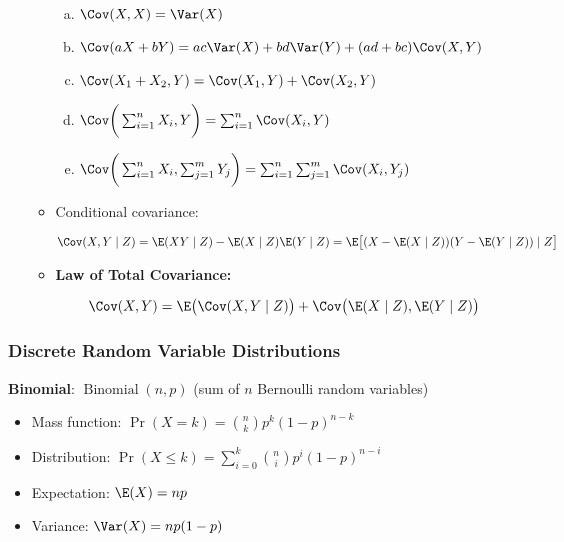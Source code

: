 \begin{itemize}
\begin{itemize}
\begin{theorem}
\begin{enumerate}[(a)]
\item \(\Cov(X, X) = \Var(X)\)

\item \(\Cov(aX + bY) = ac\Var(X) + bd\Var(Y) + (ad + bc)\Cov(X, Y)\)

\item \(\Cov(X_1 + X_2, Y) = \Cov(X_1, Y) + \Cov(X_2, Y)\)

\item \(\Cov\bigg( \sum_{i=1}^n X_i , Y\bigg) = \sum_{i=1}^n \Cov(X_i, Y)\)

\item \(\Cov\bigg( \sum_{i=1}^n X_i, \sum_{j=1}^m Y_j \bigg) = \sum_{i=1}^n \sum_{j=1}^m \Cov(X_i, Y_j)
\)

\end{enumerate}
\end{theorem}

\item \begin{definition} Conditional covariance: 

\[
\Cov(X, Y \mid Z) = \E(XY \mid Z) - \E(X \mid Z) \E(Y \mid Z) = \E \big[ (X - \E(X \mid Z))(Y - \E(Y \mid Z)) \mid Z\big]
\] \end{definition}

\item \begin{theorem} \textbf{Law of Total Covariance:}

\[
\Cov(X, Y) = \E\big(\Cov(X, Y \mid Z) \big) + \Cov \big(\E(X \mid Z), \E(Y \mid Z) \big)
\]
\end{theorem}

\end{itemize}

\end{itemize}

\subsubsection{Discrete Random Variable Distributions}

\textbf{Binomial}: \(\operatorname{Binomial}(n, p)\) (sum of \(n\) Bernoulli random variables)

\begin{itemize}

\item Mass function: \(\Pr(X = k) = \binom{n}{k}p^k(1-p)^{n-k}  \)

\item Distribution: \(\Pr(X \leq k) = \sum_{i=0}^k \binom{n}{i}p^i(1-p)^{n-i} \)

\item Expectation: \(\E(X) = np \)

\item Variance: \(\Var(X) = np(1-p) \)

\end{itemize}

